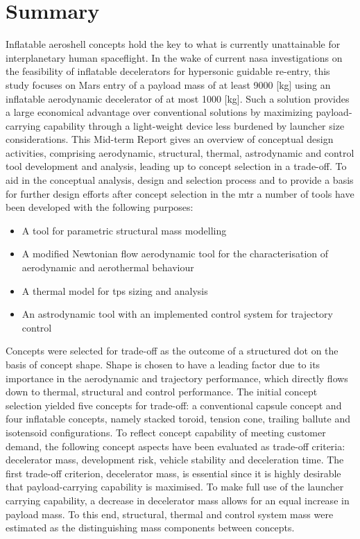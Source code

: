 \section*{Summary}\label{cha:summary}


Inflatable aeroshell concepts hold the key to what is currently unattainable for interplanetary human spaceflight. In the wake of current \acrfull{nasa} investigations on the feasibility of inflatable decelerators for hypersonic guidable re-entry, this study focuses on Mars entry of a payload mass of at least 9000 [kg] using an inflatable aerodynamic decelerator of at most 1000 [kg]. Such a solution provides a large economical advantage over conventional solutions by maximizing payload-carrying capability through a light-weight device less burdened by launcher size considerations. This Mid-term Report gives an overview of conceptual design activities, comprising aerodynamic, structural, thermal, astrodynamic and control tool development and analysis, leading up to concept selection in a trade-off.
\newline
\newline
To aid in the conceptual analysis, design and selection process and to provide a basis for further design efforts after concept selection in the \acrfull{mtr} a number of tools have been developed with the following purposes:
\begin{itemize}
\item A tool for parametric structural mass modelling
\item A modified Newtonian flow aerodynamic tool for the characterisation of aerodynamic and aerothermal behaviour
\item A thermal model for \acrfull{tps} sizing and analysis
\item An astrodynamic tool with an implemented control system for trajectory control
\end{itemize}

Concepts were selected for trade-off as the outcome of a structured \acrfull{dot} on the basis of concept shape. Shape is chosen to have a leading factor due to its importance in the aerodynamic and trajectory performance, which directly flows down to thermal, structural and control performance. The initial concept selection yielded five concepts for trade-off: a conventional capsule concept and four inflatable concepts, namely stacked toroid, tension cone, trailing ballute and isotensoid configurations. To reflect concept capability of meeting customer demand, the following concept aspects have been evaluated as trade-off criteria: decelerator mass, development risk, vehicle stability and deceleration time.
\newline
\newline
The first trade-off criterion, decelerator mass, is essential since it is highly desirable that payload-carrying capability is maximised. To make full use of the launcher carrying capability, a decrease in decelerator mass allows for an equal increase in payload mass. To this end, structural, thermal and control system mass were estimated as the distinguishing mass components between concepts. 

